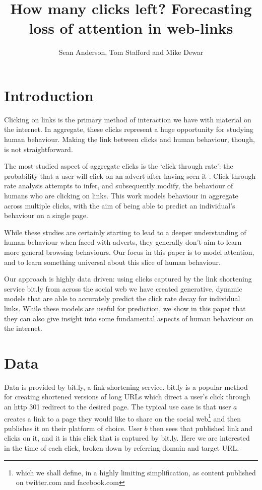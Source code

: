 \documentclass{article}
\title{How many clicks left?  Forecasting loss of attention in web-links}
\author{Sean Anderson, Tom Stafford and Mike Dewar}
\begin{document}
    
    \maketitle
    
    \section{Introduction}
    
    Clicking on links is the primary method of interaction we have with material on the internet. In aggregate, these clicks represent a huge opportunity for studying human behaviour. Making the link between clicks and human behaviour, though, is not straightforward.
    
    The most studied aspect of aggregate clicks is the `click through rate': the probability that a user will click on an advert after having seen it \cite{}. Click through rate analysis attempts to infer, and subsequently modify, the behaviour of humans who are clicking on links. This work models behaviour in aggregate across multiple clicks, with the aim of being able to predict an individual's behaviour on a single page.
    
    
    While these studies are certainly starting to lead to a deeper understanding of human behaviour when faced with adverts, they generally don't aim to learn more general browsing behaviours. Our focus in this paper is to model attention, and to learn something universal about this slice of human behaviour.
    
    Our approach is highly data driven: using clicks captured by the link shortening service bit.ly from across the social web we have created generative, dynamic models that are able to accurately predict the click rate decay for individual links. While these models are useful for prediction, we show in this paper that they can also give insight into some fundamental aspects of human behaviour on the internet. 
    
    \section{Data}
    
    Data is provided by bit.ly, a link shortening service. bit.ly is a popular method for creating shortened versions of long URLs which direct a user's click through an http 301 redirect to the desired page. The typical use case is that user $a$ creates a link to a page they would like to share on the social web\footnote{which we shall define, in a highly limiting simplification, as content published on twitter.com and facebook.com} and then publishes it on their platform of choice. User $b$ then sees that published link and clicks on it, and it is this click that is captured by bit.ly. Here we are interested in the time of each click, broken down by referring domain and target URL. 
    
\end{document}
